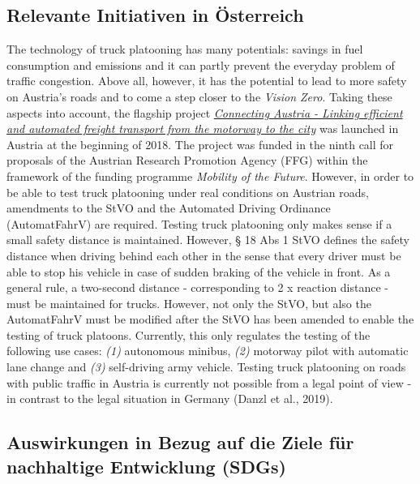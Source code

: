 \documentclass[
]{book}
\begin{document}
\hypertarget{relevante-initiativen-in-uxf6sterreich-10}{%
\subsection*{Relevante Initiativen in Österreich}\label{relevante-initiativen-in-uxf6sterreich-10}}

The technology of truck platooning has many potentials: savings in fuel consumption and emissions and it can partly prevent the everyday problem of traffic congestion. Above all, however, it has the potential to lead to more safety on Austria's roads and to come a step closer to the \emph{Vision Zero}.
Taking these aspects into account, the flagship project \href{https://trimis.ec.europa.eu/project/connecting-austria-linking-efficient-and-automated-freight-traffic-motorway-city}{\emph{Connecting Austria - Linking efficient and automated freight transport from the motorway to the city}} was launched in Austria at the beginning of 2018. The project was funded in the ninth call for proposals of the Austrian Research Promotion Agency (FFG) within the framework of the funding programme \emph{Mobility of the Future}.
However, in order to be able to test truck platooning under real conditions on Austrian roads, amendments to the StVO and the Automated Driving Ordinance (AutomatFahrV) are required. Testing truck platooning only makes sense if a small safety distance is maintained. However, § 18 Abs 1 StVO defines the safety distance when driving behind each other in the sense that every driver must be able to stop his vehicle in case of sudden braking of the vehicle in front. As a general rule, a two-second distance - corresponding to 2 x reaction distance - must be maintained for trucks. However, not only the StVO, but also the AutomatFahrV must be modified after the StVO has been amended to enable the testing of truck platoons. Currently, this only regulates the testing of the following use cases: \emph{(1)} autonomous minibus, \emph{(2)} motorway pilot with automatic lane change and \emph{(3)} self-driving army vehicle. Testing truck platooning on roads with public traffic in Austria is currently not possible from a legal point of view - in contrast to the legal situation in Germany (Danzl et al., 2019).

\hypertarget{auswirkungen-in-bezug-auf-die-ziele-fuxfcr-nachhaltige-entwicklung-sdgs-10}{%
\subsection*{Auswirkungen in Bezug auf die Ziele für nachhaltige Entwicklung (SDGs)}\label{auswirkungen-in-bezug-auf-die-ziele-fuxfcr-nachhaltige-entwicklung-sdgs-10}}
\end{document}
